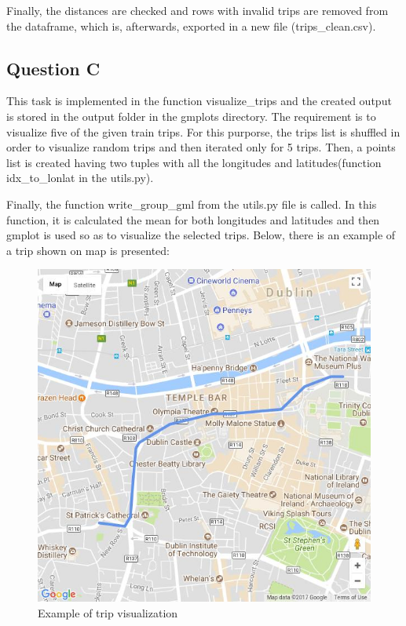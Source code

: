 \documentclass[12pt]{article}
\begin{document}
	Finally, the distances are checked and rows with invalid trips are removed from the dataframe, which is, afterwards, exported in a new file (trips\_clean.csv).
	
	\subsection{Question C}
	This task is implemented in the function visualize\_trips and the created output is stored in the output folder in the gmplots directory. The requirement is to visualize five of the given train trips. For this purporse, the trips list is shuffled in order to visualize random trips and then iterated only for 5 trips. Then, a points list is created having two tuples with all the longitudes and latitudes(function idx\_to\_lonlat in the utils.py). 
	
	Finally, the function write\_group\_gml from the utils.py file is called. In this function, it is calculated the mean for both longitudes and latitudes and then gmplot is used so as to visualize the selected trips. Below, there is an example of a trip shown on map is presented:
	
	\begin{figure} [H]
		\begin{center}
			\includegraphics [scale = 0.75] {questionCexample.jpg}
			\caption{Example of trip visualization}
		\end{center}
	\end{figure} 
	
\end{document}
